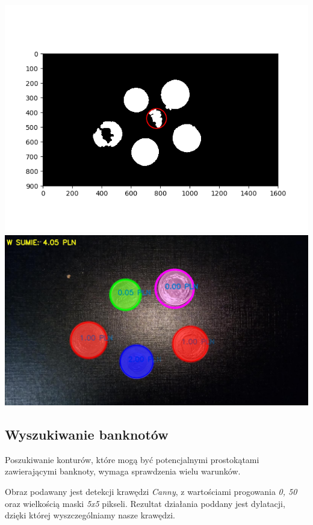 \documentclass{mwart}
\begin{document}
\begin{center}
    \includegraphics[width=\textwidth]{Area.png}
    \includegraphics[width=\textwidth]{bb_000.jpg}
\end{center}

\subsection{Wyszukiwanie banknotów}
Poszukiwanie konturów, które mogą być potencjalnymi prostokątami zawierającymi banknoty, wymaga sprawdzenia wielu warunków.

Obraz podawany jest detekcji krawędzi \textit{Canny}, z wartościami progowania \textit{0, 50} oraz wielkością maski \textit{5x5} pikseli. Rezultat działania poddany jest dylatacji, dzięki której wyszczególniamy nasze krawędzi.
\end{document}
